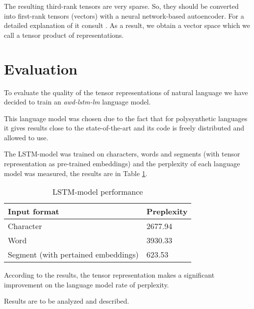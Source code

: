 \documentclass[leqno]{article}
\begin{document}
The resulting third-rank tensors are very sparse. So, they
should be converted into first-rank tensors (vectors) with a neural network-based autoencoder. For a detailed explanation of it consult \parencite[47-50]{schwartz2020neural}.
As a result, we obtain a vector space which we call a tensor product of representations.

\section{Evaluation}

To evaluate the quality of the tensor representations of natural language we have decided to train an \textit{awd-lstm-lm} \parencite{awd-lstm} language model.

This language model was chosen due to the fact that for polysynthetic languages it gives results close to the state-of-the-art and its code is freely distributed and allowed to use.

The LSTM-model was trained on characters, words and segments (with  tensor representation as pre-trained embeddings) and the perplexity of each language model was measured, the results are in Table \ref{tab:result}. 
\begin{table}[h]
\centering
\begin{tabular}{|l|l|}
\hline
Input format                        & Preplexity   \\ \hline
Character                           & 2677.94 \\ \hline
Word                                & 3930.33 \\ \hline
Segment (with pertained embeddings) & 623.53 \\ \hline
\end{tabular}
\caption{LSTM-model performance}
\label{tab:result}
\end{table}

According to the results, the tensor representation makes a significant improvement on the language model rate of perplexity.


Results are to be analyzed and described.
\end{document}
